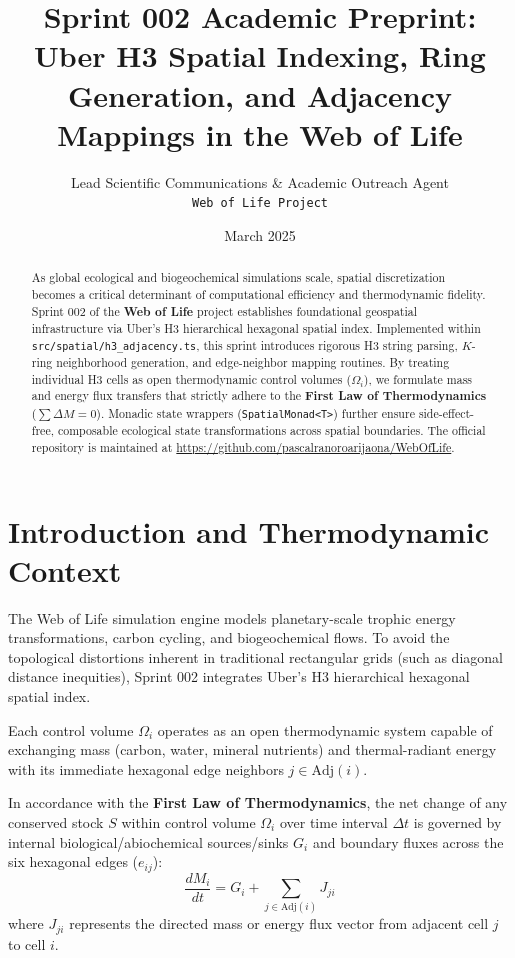 \documentclass[11pt, a4paper]{article}
\title{\textbf{Sprint 002 Academic Preprint: Uber H3 Spatial Indexing, Ring Generation, and Adjacency Mappings in the Web of Life}}
\author{Lead Scientific Communications \& Academic Outreach Agent \\ \texttt{Web of Life Project}}
\date{March 2025}
\begin{document}
\maketitle

\begin{abstract}
As global ecological and biogeochemical simulations scale, spatial discretization becomes a critical determinant of computational efficiency and thermodynamic fidelity. Sprint 002 of the \textbf{Web of Life} project establishes foundational geospatial infrastructure via Uber's H3 hierarchical hexagonal spatial index. Implemented within \texttt{src/spatial/h3\_adjacency.ts}, this sprint introduces rigorous H3 string parsing, $K$-ring neighborhood generation, and edge-neighbor mapping routines. By treating individual H3 cells as open thermodynamic control volumes ($\Omega_i$), we formulate mass and energy flux transfers that strictly adhere to the \textbf{First Law of Thermodynamics} ($\sum \Delta M = 0$). Monadic state wrappers (\texttt{SpatialMonad<T>}) further ensure side-effect-free, composable ecological state transformations across spatial boundaries. The official repository is maintained at \url{https://github.com/pascalranoroarijaona/WebOfLife}.
\end{abstract}

\section{Introduction and Thermodynamic Context}
The Web of Life simulation engine models planetary-scale trophic energy transformations, carbon cycling, and biogeochemical flows. To avoid the topological distortions inherent in traditional rectangular grids (such as diagonal distance inequities), Sprint 002 integrates Uber's H3 hierarchical hexagonal spatial index.

Each control volume $\Omega_i$ operates as an open thermodynamic system capable of exchanging mass (carbon, water, mineral nutrients) and thermal-radiant energy with its immediate hexagonal edge neighbors $j \in \text{Adj}(i)$. 

In accordance with the \textbf{First Law of Thermodynamics}, the net change of any conserved stock $S$ within control volume $\Omega_i$ over time interval $\Delta t$ is governed by internal biological/abiochemical sources/sinks $G_i$ and boundary fluxes across the six hexagonal edges ($e_{ij}$):
\begin{equation}
\frac{dM_i}{dt} = G_i + \sum_{j \in \text{Adj}(i)} J_{ji}
\end{equation}
where $J_{ji}$ represents the directed mass or energy flux vector from adjacent cell $j$ to cell $i$.
\end{document}

